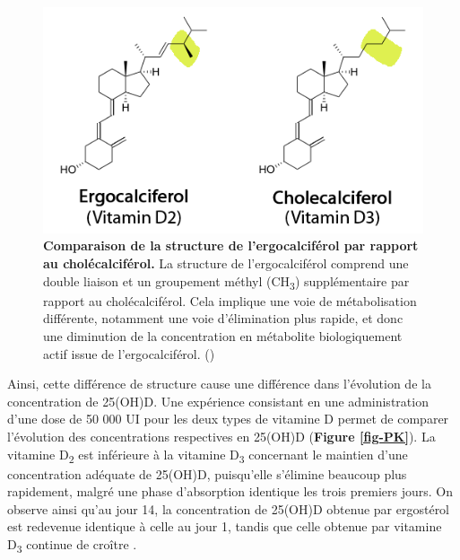 \documentclass[
  a4paper,
  DIV=11,
  numbers=noendperiod,
  listof=totoc]{scrreprt}
\begin{document}
\begin{figure}
\includegraphics{figures/ergo_vs_chole.png} 
\caption[\textbf{Comparaison de la structure de l'ergocalciférol par rapport au cholécalciférol.}]
{\textbf{Comparaison de la structure de l'ergocalciférol par rapport au cholécalciférol.} La structure de l'ergocalciférol comprend une double liaison et un groupement méthyl (CH\textsubscript{3}) supplémentaire par rapport au cholécalciférol. Cela implique une voie de métabolisation différente, notamment une voie d'élimination plus rapide, et donc une diminution de la concentration en métabolite biologiquement actif issue de l'ergocalciférol. (\cite{Houghton.2006})}
\label{fig:ergo-struc}
\end{figure}

Ainsi, cette différence de structure cause une différence dans
l'évolution de la concentration de 25(OH)D. Une expérience consistant en
une administration d'une dose de 50 000 UI pour les deux types de
vitamine D permet de comparer l'évolution des concentrations respectives
en 25(OH)D (\textbf{Figure \ref{fig-PK}}). La vitamine
D\textsubscript{2} est inférieure à la vitamine D\textsubscript{3}
concernant le maintien d'une concentration adéquate de 25(OH)D,
puisqu'elle s'élimine beaucoup plus rapidement, malgré une phase
d'absorption identique les trois premiers jours. On observe ainsi qu'au
jour 14, la concentration de 25(OH)D obtenue par ergostérol est
redevenue identique à celle au jour 1, tandis que celle obtenue par
vitamine D\textsubscript{3} continue de croître \autocite{Armas.2004}.
\end{document}

